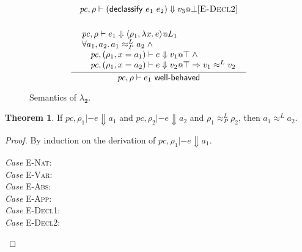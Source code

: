 \documentclass{article}
\makeatletter
\newcommand{\at}{\ensuremath{{\scriptstyle{@}}}}
\newcommand{\pc}{\ensuremath{{\mathit{pc}}}}
\theoremstyle{definition}
\newtheorem{theorem}{Theorem}
\makeatother
\begin{document}
\begin{figure}[h]
\begin{gather*}
{{\begin{array}{l}
        \end{array}}
    }{
      \pc, \rho |- (\mathsf{declassify}\ e_1\ e_2) \Downarrow v_3 \at \bot
    }[\textsc{E-Decl2}]
    \\[3ex]
    \inference{
      {\begin{array}{l}
          \pc, \rho |- e_1 \Downarrow
          \langle{\rho_1, \lambda{x}.\, e\rangle} \at L_1
          \\
          \forall{a_1, a_2}.\,
          a_1 \approx^{L}_{P} a_2\; \land
          \\\quad
          \pc, (\rho_1, x = a_1) |- e \Downarrow v_1 \at \top\; \land
          \\\quad
          \pc, (\rho_1, x = a_2) |- e \Downarrow v_2 \at \top =>
          v_1 \approx^{L} v_2
        \end{array}}
    }{
      \pc, \rho |- e_1\ \textsf{well-behaved}
    }
  \end{gather*}
  \caption{Semantics of $\lambda_{\mathbf{2}}$.}
  \label{fig:semantics}
\end{figure}

\begin{theorem}
  If $\pc, \rho_1 |- e \Downarrow a_1$ and $\pc, \rho_2 |- e \Downarrow a_2$
  and $\rho_1 \approx^{L}_{P} \rho_2$, then $a_1 \approx^{L} a_2$.
\end{theorem}
\begin{proof}
  By induction on the derivation of $\pc, \rho_1 |- e \Downarrow a_1$.
  \begin{description}
  \item[\emph{Case} \textsc{E-Nat}:]
  \item[\emph{Case} \textsc{E-Var}:]
  \item[\emph{Case} \textsc{E-Abs}:]
  \item[\emph{Case} \textsc{E-App}:]
  \item[\emph{Case} \textsc{E-Decl1}:]
  \item[\emph{Case} \textsc{E-Decl2}:]
    \qedhere
  \end{description}
\end{proof}
\end{document}
